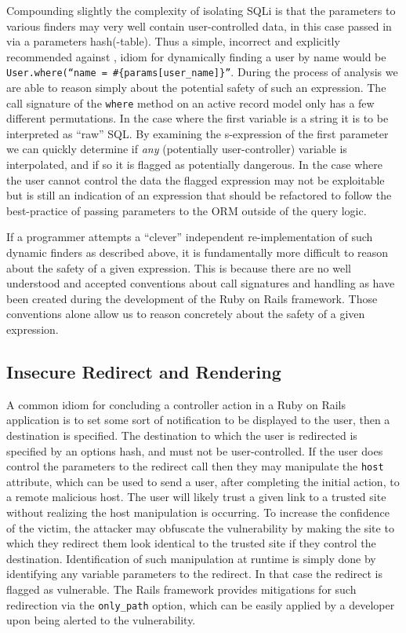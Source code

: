 \documentclass[conference]{IEEEtran}
\begin{document}
Compounding slightly the complexity of isolating SQLi is that the parameters to various
finders may very well contain user-controlled data, in this case passed in via a
parameters hash(-table).  Thus a simple, incorrect and explicitly recommended against
\cite{rails_security}, idiom for dynamically
finding a user by name would be \texttt{User.where(``name = \#\{params[user\_name]\}''}.
During the process of analysis we are able to reason simply about the
potential safety of such an expression.  The call signature of the
\texttt{where} method on an active record model only has a few different
permutations.  In the case where the first variable is a string it is to be
interpreted as ``raw'' SQL.  By examining the s-expression of the first
parameter we can quickly determine if \emph{any} (potentially user-controller)
variable is interpolated, and if so it is flagged as potentially dangerous.  In
the case where the user cannot control the data the flagged expression may not
be exploitable but is still an indication of an expression that should be
refactored to follow the best-practice of passing parameters to the ORM outside
of the query logic\cite{rails_security_sqli}.

If a programmer attempts a ``clever'' independent re-implementation of such
dynamic finders as described above, it is fundamentally more difficult to reason
about the safety of a given expression.  This is because there are no well understood and
accepted conventions about call signatures and handling as have been created during the
development of the Ruby on Rails framework.  Those conventions alone allow us to reason
concretely about the safety of a given expression.

\subsection{Insecure Redirect and Rendering}

A common idiom for concluding a controller action in a Ruby on Rails application
is to set some sort of notification to be displayed to the user, then a
destination is specified.  The destination to which the user is redirected is
specified by an options hash, and must not be user-controlled.  If the user does control the
parameters to the redirect call then they may manipulate the \texttt{host} attribute,
which can be used to send a user, after completing the initial action, to a remote
malicious host\cite{OWASP_redirect}.  The user will likely trust a given link to a trusted
site without realizing the host manipulation is occurring. To increase the confidence of
the victim, the attacker may obfuscate the vulnerability by making the site to which they
redirect them look identical to the trusted site if they control the destination.
Identification of such manipulation at runtime is simply done by identifying any variable
parameters to the redirect.  In that case the redirect is flagged as vulnerable.  The
Rails framework provides mitigations for such redirection via the \texttt{only\_path}
option, which can be easily applied by a developer upon being alerted to the
vulnerability.
\end{document}
